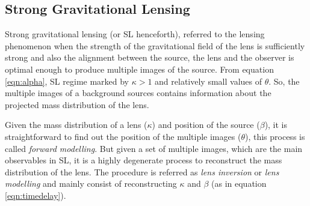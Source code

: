 \subsection{Strong Gravitational Lensing}\label{sec:sl}

Strong gravitational lensing (or SL henceforth), referred to the lensing phenomenon
when the strength of the gravitational field of the lens is sufficiently strong and 
also the alignment between the source, the lens and the observer is optimal enough to
produce multiple images of the source. From equation \ref{eqn:alpha}, SL regime marked
by $\kappa >1$ and relatively small values of $\theta$. So, the multiple images of a
background sources contains information about the projected mass distribution of the lens. 

Given the mass distribution of a lens ($\kappa$) and position of the source ($\beta$),
it is straightforward to find out the position of the multiple images ($\theta$), this process
is called {\it forward modelling}. But given a set of multiple images, which are the main 
observables in SL, it is a highly degenerate process to reconstruct the mass
distribution of the lens. The procedure is referred as {\it lens inversion} or
{\it lens modelling} and mainly consist of reconstructing $\kappa$ and
$\beta$ (as in equation \ref{eqn:timedelay}). 


